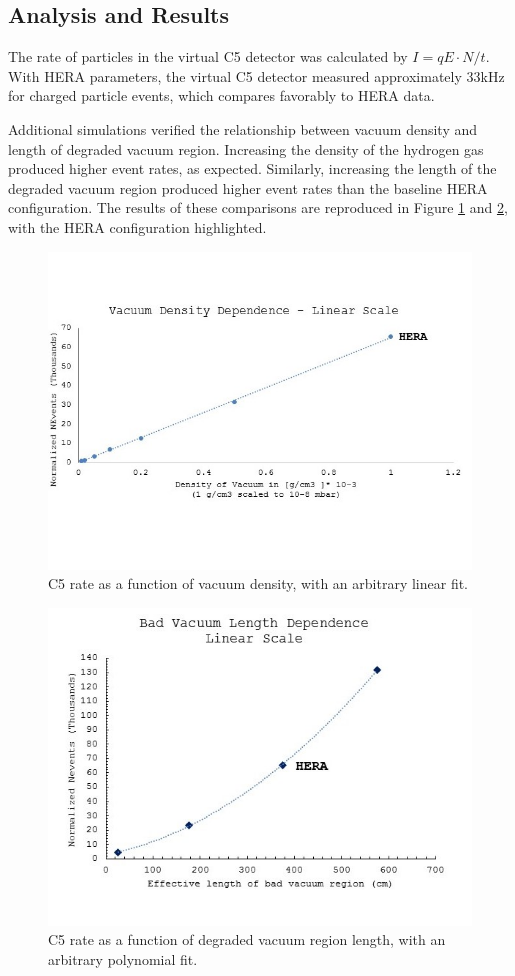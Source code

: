 \subsection{Analysis and Results}
The rate of particles in the virtual C5 detector was calculated by $I = qE\cdot N/t$.  With HERA parameters, the virtual C5 detector measured approximately 33kHz for charged particle events, which compares favorably to HERA data.  

Additional simulations verified the relationship between vacuum density and length of degraded vacuum region.  Increasing the density of the hydrogen gas produced higher event rates, as expected.  Similarly, increasing the length of the degraded vacuum region produced higher event rates than the baseline HERA configuration.  The results of these comparisons are reproduced in Figure \ref{fig:hera5} and \ref{fig:hera6}, with the HERA configuration highlighted.

\begin{figure}[!hbt]
	\centering
	\includegraphics[width=.75\textwidth]{../../img/density_dep_lin_crop.jpg}
	\caption {C5 rate as a function of vacuum density, with an arbitrary linear fit.}
	\label{fig:hera5}
\end{figure}	

\begin{figure}[!hbt]
	\centering	\includegraphics[width=.75\textwidth]{../../img/length_dep_poly_crop.jpg}	
	\caption {C5 rate as a function of degraded vacuum region length, with an arbitrary polynomial fit.}
	\label{fig:hera6}
\end{figure}



